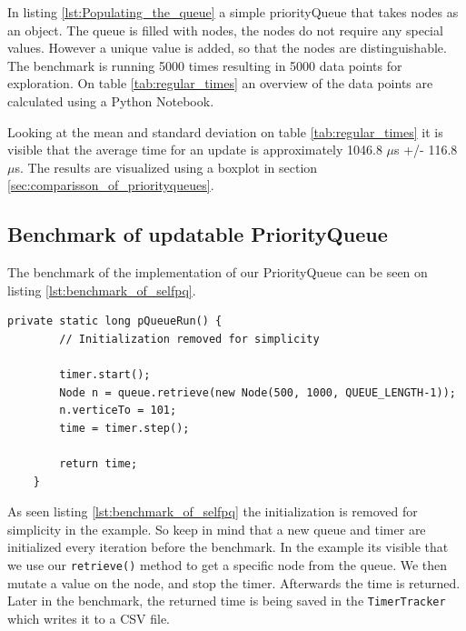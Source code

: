 \documentclass{article}
\begin{document}
In listing \ref{lst:Populating_the_queue} a simple priorityQueue that takes nodes as an object. 
The queue is filled with nodes, the nodes do not require any special values. However a unique 
value is added, so that the nodes are distinguishable.
The benchmark is running 5000 times resulting in 5000 data points for exploration. 
On table \ref{tab:regular_times} an overview of the data points are calculated using a Python Notebook.

Looking at the mean and standard deviation on table \ref{tab:regular_times} it is 
visible that the average time for an update is approximately 1046.8 $\mu$s +/- 116.8 $\mu$s. 
The results are visualized using a boxplot in section \ref{sec:comparisson_of_priorityqueues}.





\subsection{Benchmark of updatable PriorityQueue} %
The benchmark of the implementation of our PriorityQueue can be seen on 
listing \ref{lst:benchmark_of_selfpq}.

\begin{lstlisting}[caption={Benchmark implmentation on our PriorityQueue},label={lst:benchmark_of_selfpq}]
    private static long pQueueRun() {
        // Initialization removed for simplicity

        timer.start();
        Node n = queue.retrieve(new Node(500, 1000, QUEUE_LENGTH-1));
        n.verticeTo = 101;
        time = timer.step();

        return time;
    }
\end{lstlisting}

As seen listing \ref{lst:benchmark_of_selfpq} the initialization is removed for simplicity in the example. 
So keep in mind that a new queue and timer are initialized every iteration before the benchmark. 
In the example its visible that we use our \lstinline{retrieve()} method to get a specific 
node from the queue. We then mutate a value on the node, and stop the timer. 
Afterwards the time is returned. Later in the benchmark, the returned time is being saved in the
\lstinline{TimerTracker} which writes it to a CSV file. 
\end{document}
